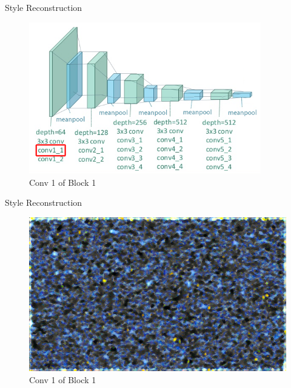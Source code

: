 \documentclass{beamer}
\begin{document}
\begin{frame}{Style Reconstruction}
\begin{figure}[ht]
\centering
\caption*{Conv 1 of Block 1}
\includegraphics[width=0.9\textwidth]{img/vgg19/style/block1_conv1}
\end{figure}
\end{frame}
\begin{frame}{Style Reconstruction}
\begin{figure}[ht]
\centering
\caption*{Conv 1 of Block 1}
\includegraphics[width=\textwidth]{img/style/block1_conv1.png}
\end{figure}
\end{frame}
\end{document}

